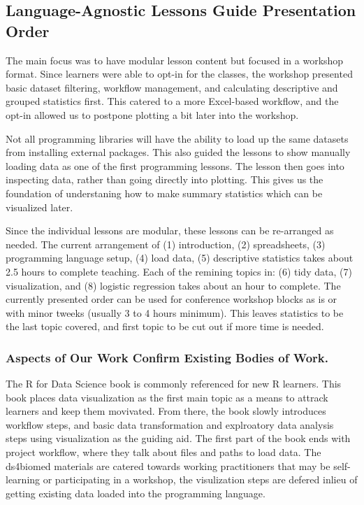 \documentclass[030-workshop.tex]{subfiles}
\begin{document}
    \subsection{Language-Agnostic Lessons Guide Presentation Order}

        The main focus was to have modular lesson content but focused in a workshop format.
        Since learners were able to opt-in for the classes,
        the workshop presented basic dataset filtering, workflow management, and calculating descriptive and grouped statistics first.
        This catered to a more Excel-based workflow,
        and the opt-in allowed us to postpone plotting a bit later into the workshop.

        Not all programming libraries will have the ability to load up the same datasets from installing external packages.
        This also guided the lessons to show manually loading data as one of the first programming lessons.
        The lesson then goes into inspecting data, rather than going directly into plotting.
        This gives us the foundation of understaning how to make summary statistics which can be visualized later.

        Since the individual lessons are modular, these lessons can be re-arranged as needed.
        The current arrangement of
        (1) introduction,
        (2) spreadsheets,
        (3) programming language setup,
        (4) load data,
        (5) descriptive statistics
        takes about 2.5 hours to complete teaching.
        Each of the remining topics in:
        (6) tidy data,
        (7) visualization, and
        (8) logistic regression
        takes about an hour to complete.
        The currently presented order can be used for conference workshop blocks as is or with minor tweeks (usually 3 to 4 hours minimum).
        This leaves statistics to be the last topic covered, and first topic to be cut out if more time is needed.

        \subsubsection{Aspects of Our Work Confirm Existing Bodies of Work.}

            The R for Data Science book is commonly referenced for new R learners.
            This book places data visualization as the first main topic as a means to attrack learners and keep them movivated.
            From there, the book slowly introduces workflow steps, and basic data transformation and explroatory data analysis
            steps using visualization as the guiding aid.
            The first part of the book ends with project workflow, where they talk about files and paths to load data.
            The ds4biomed materials are catered towards working practitioners that may be self-learning or participating in a workshop,
            the visulization steps are defered inlieu of getting existing data loaded into the programming language.
\end{document}
